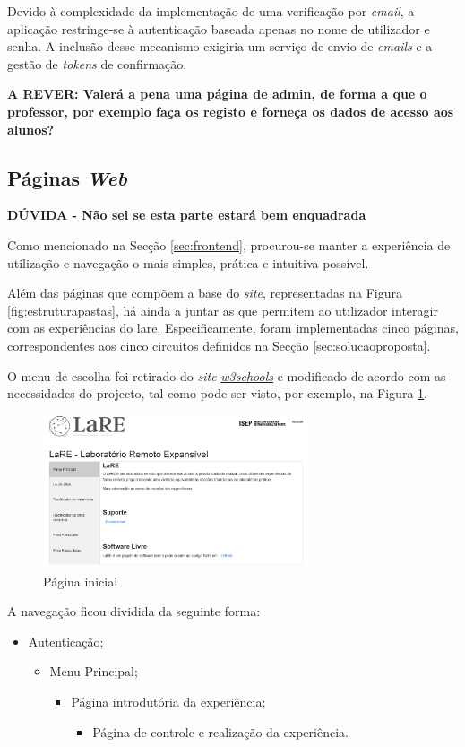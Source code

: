 Devido à complexidade da implementação de uma verificação por \textit{email}, a aplicação restringe-se à autenticação baseada apenas no nome de utilizador e senha. A inclusão desse mecanismo exigiria um serviço de envio de \textit{emails} e a gestão de \textit{tokens} de confirmação.

\textbf{A REVER: Valerá a pena uma página de admin, de forma a que o professor, por exemplo faça os registo e forneça os dados de acesso aos alunos?}

\subsection{Páginas \textit{Web}}
\label{sec:paginas}
\textbf{DÚVIDA - Não sei se esta parte estará bem enquadrada}

Como mencionado na Secção \ref{sec:frontend}, procurou-se manter a experiência de utilização e navegação o mais simples, prática e intuitiva possível.

Além das páginas que compõem a base do \textit{site}, representadas na Figura \ref{fig:estruturapastas}, há ainda a juntar as que permitem ao utilizador interagir com as experiências do \acrshort{lare}. Especificamente, foram implementadas cinco páginas, correspondentes aos cinco circuitos definidos na Secção \ref{sec:solucaoproposta}.

O menu de escolha foi retirado do \textit{site} \href{https://www.w3schools.com/howto/howto_js_vertical_tabs.asp}{\textit{w3schools}} e modificado de acordo com as necessidades do projecto, tal como pode ser visto, por exemplo, na Figura \ref{fig:pagmenu}.

\begin{figure}[hbtp]
	\centering
	\includegraphics[width=0.7\textwidth]{figures/menupage.png}
	\caption{Página inicial}
	\label{fig:pagmenu}
\end{figure}

A navegação ficou dividida da seguinte forma:
\begin{itemize}
	\item Autenticação;
	\begin{itemize}
		\item Menu Principal;
		\begin{itemize}
			\item Página introdutória da experiência;
			\begin{itemize}
				\item Página de controle e realização da experiência.
			\end{itemize}
		\end{itemize}
	\end{itemize}
\end{itemize}

